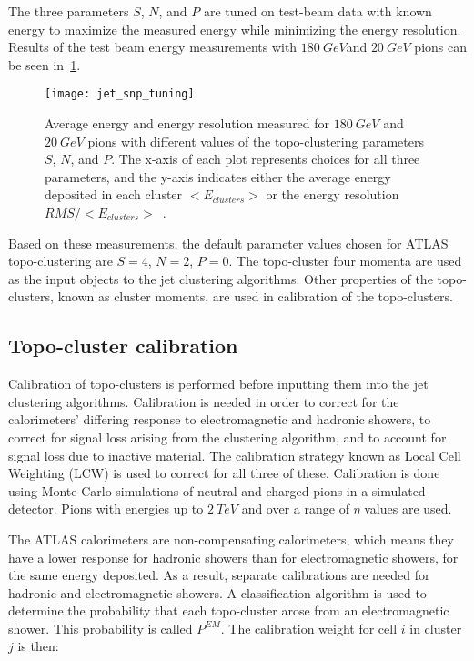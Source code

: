 The three parameters $S$, $N$, and $P$ are tuned on test-beam data with known energy to maximize the measured energy while minimizing the energy resolution\cite{energy-measurement-of-hadrons}.
Results of the test beam energy measurements with $180~GeV$and $20~GeV$ pions can be seen in~\ref{fig:jet_snp_tuning}.
\begin{figure}[!ht]
    \centering
\texttt{[image: jet\_snp\_tuning]}
\caption{Average energy and energy resolution measured for $180~GeV$ and $20~GeV$ pions with different values of the
topo-clustering parameters $S$, $N$, and $P$.
The x-axis of each plot represents choices for all three parameters, and the y-axis indicates either the average
energy deposited in each cluster $<E_{clusters}>$ or the energy resolution $RMS/<E_{clusters}>$~\cite{energy-measurement-of-hadrons}.}
\label{fig:jet_snp_tuning}
\end{figure}
Based on these measurements, the default parameter values chosen for ATLAS topo-clustering are $S=4$, $N=2$, $P=0$.
The topo-cluster four momenta are used as the input objects to the jet clustering algorithms.
Other properties of the topo-clusters, known as cluster moments, are used in calibration of the topo-clusters.

\subsection{Topo-cluster calibration}\label{subsec:topo_calibration}

Calibration of topo-clusters is performed before inputting them into the jet clustering algorithms.
Calibration is needed in order to correct for the calorimeters' differing response to electromagnetic and hadronic showers, to correct for signal loss arising from the clustering algorithm, and to account for signal loss due to inactive material.
The calibration strategy known as Local Cell Weighting (LCW) is used to correct for all three of these.
Calibration is done using Monte Carlo simulations of neutral and charged pions in a simulated detector.
Pions with energies up to $2~TeV$ and over a range of $\eta$ values are used.

The ATLAS calorimeters are non-compensating calorimeters, which means they have a lower response for hadronic showers than for electromagnetic showers, for the same energy deposited.
As a result, separate calibrations are needed for hadronic and electromagnetic showers.
A classification algorithm is used to determine the probability that each topo-cluster arose from an electromagnetic shower.
This probability is called $P^{EM}$.
The calibration weight for cell $i$ in cluster $j$ is then:

